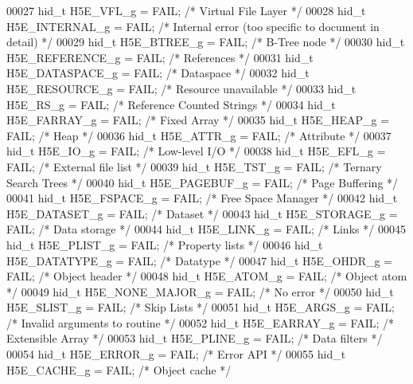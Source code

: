 \begin{DoxyCode}
00027 hid\_t H5E\_VFL\_g            = FAIL;      \textcolor{comment}{/* Virtual File Layer */}
00028 hid\_t H5E\_INTERNAL\_g       = FAIL;      \textcolor{comment}{/* Internal error (too specific to document in detail) */}
00029 hid\_t H5E\_BTREE\_g          = FAIL;      \textcolor{comment}{/* B-Tree node */}
00030 hid\_t H5E\_REFERENCE\_g      = FAIL;      \textcolor{comment}{/* References */}
00031 hid\_t H5E\_DATASPACE\_g      = FAIL;      \textcolor{comment}{/* Dataspace */}
00032 hid\_t H5E\_RESOURCE\_g       = FAIL;      \textcolor{comment}{/* Resource unavailable */}
00033 hid\_t H5E\_RS\_g             = FAIL;      \textcolor{comment}{/* Reference Counted Strings */}
00034 hid\_t H5E\_FARRAY\_g         = FAIL;      \textcolor{comment}{/* Fixed Array */}
00035 hid\_t H5E\_HEAP\_g           = FAIL;      \textcolor{comment}{/* Heap */}
00036 hid\_t H5E\_ATTR\_g           = FAIL;      \textcolor{comment}{/* Attribute */}
00037 hid\_t H5E\_IO\_g             = FAIL;      \textcolor{comment}{/* Low-level I/O */}
00038 hid\_t H5E\_EFL\_g            = FAIL;      \textcolor{comment}{/* External file list */}
00039 hid\_t H5E\_TST\_g            = FAIL;      \textcolor{comment}{/* Ternary Search Trees */}
00040 hid\_t H5E\_PAGEBUF\_g        = FAIL;      \textcolor{comment}{/* Page Buffering */}
00041 hid\_t H5E\_FSPACE\_g         = FAIL;      \textcolor{comment}{/* Free Space Manager */}
00042 hid\_t H5E\_DATASET\_g        = FAIL;      \textcolor{comment}{/* Dataset */}
00043 hid\_t H5E\_STORAGE\_g        = FAIL;      \textcolor{comment}{/* Data storage */}
00044 hid\_t H5E\_LINK\_g           = FAIL;      \textcolor{comment}{/* Links */}
00045 hid\_t H5E\_PLIST\_g          = FAIL;      \textcolor{comment}{/* Property lists */}
00046 hid\_t H5E\_DATATYPE\_g       = FAIL;      \textcolor{comment}{/* Datatype */}
00047 hid\_t H5E\_OHDR\_g           = FAIL;      \textcolor{comment}{/* Object header */}
00048 hid\_t H5E\_ATOM\_g           = FAIL;      \textcolor{comment}{/* Object atom */}
00049 hid\_t H5E\_NONE\_MAJOR\_g     = FAIL;      \textcolor{comment}{/* No error */}
00050 hid\_t H5E\_SLIST\_g          = FAIL;      \textcolor{comment}{/* Skip Lists */}
00051 hid\_t H5E\_ARGS\_g           = FAIL;      \textcolor{comment}{/* Invalid arguments to routine */}
00052 hid\_t H5E\_EARRAY\_g         = FAIL;      \textcolor{comment}{/* Extensible Array */}
00053 hid\_t H5E\_PLINE\_g          = FAIL;      \textcolor{comment}{/* Data filters */}
00054 hid\_t H5E\_ERROR\_g          = FAIL;      \textcolor{comment}{/* Error API */}
00055 hid\_t H5E\_CACHE\_g          = FAIL;      \textcolor{comment}{/* Object cache */}

\end{DoxyCode}
